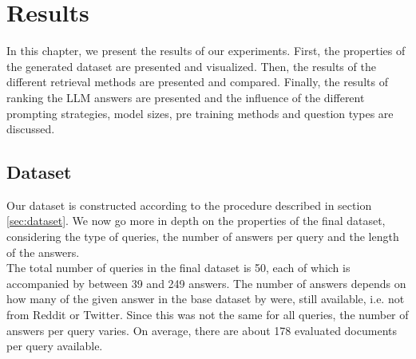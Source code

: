 \chapter{Results}\label{chapter:results}
In this chapter, we present the results of our experiments.
First, the properties of the generated dataset are presented and visualized.
Then, the results of the different retrieval methods are presented and compared.
Finally, the results of ranking the LLM answers are presented and the influence of the different prompting strategies, model sizes, pre training methods and question types are discussed.

\section{Dataset}
Our dataset is constructed according to the procedure described in section \ref{sec:dataset}.
We now go more in depth on the properties of the final dataset, considering the type of queries, the number of answers per query and the length of the answers.
\\
The total number of queries in the final dataset is 50, each of which is accompanied by between 39 and 249 answers.
The number of answers depends on how many of the given answer in the base dataset by \cite{goeuriot:2021} were, still available, i.e. not from Reddit or Twitter.
Since this was not the same for all queries, the number of answers per query varies.
On average, there are about 178 evaluated documents per query available.

